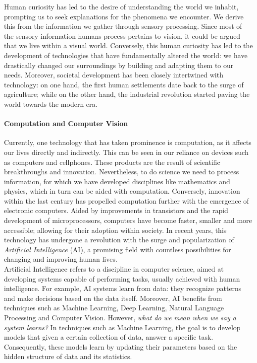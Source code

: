 Human curiosity has led to the desire of understanding the world we inhabit, prompting us to seek
explanations for the phenomena we encounter. We derive this from the information we gather through 
sensory processing. Since most of the sensory information humans process pertains 
to vision, it could be argued that we live within a visual world. Conversely, this human curiosity 
has led to the development of technologies that have fundamentally altered the world: we have 
drastically changed our surroundings by building and adapting them to our needs. Moreover, societal 
development has been closely intertwined with technology: on one hand, the first human settlements 
date back to the surge of agriculture; while on the other hand, the industrial revolution started 
paving the world towards the modern era.\\

\paragraph{Computation and Computer Vision} Currently, one technology that has taken prominence is 
computation, as it affects our lives directly and indirectly. This can be seen in our reliance on 
devices such as computers and  cellphones. These products are the result of scientific breakthroughs 
and innovation. Nevertheless, to do science we need to process information, for which we have 
developed disciplines like mathematics and physics, which in turn can be aided with computation. 
Conversely, innovation within the last century has propelled computation further with the emergence 
of electronic computers. Aided by improvements in transistors and the rapid development of 
microprocessors, computers have become faster, smaller and more accessible; allowing for their 
adoption within society. In recent years, this technology has undergone a revolution with the surge 
and popularization of \emph{Artificial Intelligence} (AI), a promising field with countless 
possibilities for changing and improving human lives.\\

\noindent Artificial Intelligence refers to a discipline in computer science, aimed at developing 
systems capable of performing tasks, usually achieved with human intelligence. For example, AI 
systems learn from data: they recognize patterns and make decisions based on the data itself. 
Moreover, AI benefits from techniques such as Machine Learning, Deep Learning, Natural Language 
Processing and Computer Vision. However, \emph{what do we mean when we say a system learns?} In 
techniques such as Machine Learning, the goal is to develop models that given a certain collection 
of data, answer a specific task. Consequently, these models learn by updating their parameters 
based on the hidden structure of data and its statistics.\\

